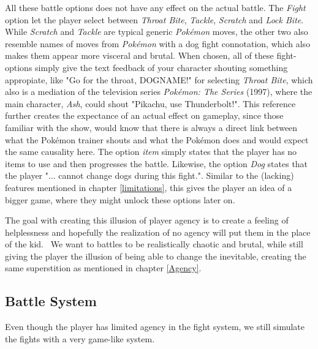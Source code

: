 All these battle options does not have any effect on the actual battle. The \textit{Fight} option let the player select between \textit{Throat Bite}, \textit{Tackle}, \textit{Scratch} and \textit{Lock Bite}. While \textit{Scratch} and \textit{Tackle} are typical generic \textit{Pok\'emon} moves, the other two also resemble names of moves from \textit{Pok\'emon} with a dog fight connotation, which also makes them appear more visceral and brutal. When chosen, all of these fight-options simply give the text feedback of your character shouting something appropiate, like "Go for the throat, DOGNAME!" for selecting \textit{Throat Bite}, which also is a mediation of the television series \textit{Pok\'emon: The Series} (1997), where the main character, \textit{Ash}, could shout "Pikachu, use Thunderbolt!". This reference further creates the expectance of an actual effect on gameplay, since those familiar with the show, would know that there is always a direct link between what the Pok\'emon trainer shouts and what the Pok\'emon does and would expect the same causality here.
The option \textit{item} simply states that the player has no items to use and then progresses the battle. Likewise, the option \textit{Dog} states that the player "... cannot change dogs during this fight.". Similar to the (lacking) features mentioned in chapter \ref{limitations}, this gives the player an idea of a bigger game, where they might unlock these options later on.\

The goal with creating this illusion of player agency is to create a feeling of helplessness and hopefully the realization of no agency will put them in the place of the kid. \ 
We want to battles to be realistically chaotic and brutal, while still giving the player the illusion of being able to change the inevitable, creating the same superstition as mentioned in chapter \ref{Agency}.\

\subsection{Battle System}
\label{battleSystem}
Even though the player has limited agency in the fight system, we still simulate the fights with a very game-like system.\

